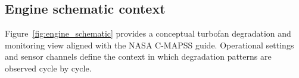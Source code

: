 \documentclass[11pt]{article}
\begin{document}
\subsection{Engine schematic context}
Figure~\ref{fig:engine_schematic} provides a conceptual turbofan degradation and monitoring view aligned with the NASA C-MAPSS guide. Operational settings and sensor channels define the context in which degradation patterns are observed cycle by cycle.



\end{document}
